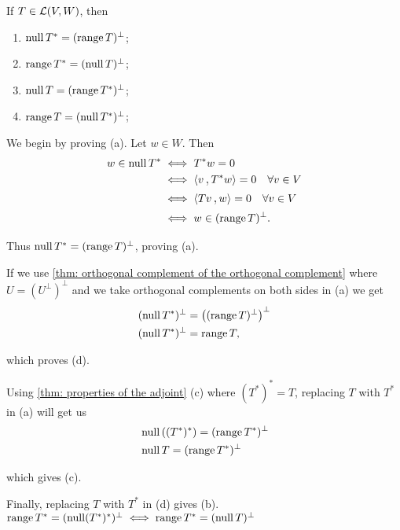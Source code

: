 \begin{thm}
  \label{thm: null space and range of T^*}
  If $T \in {\mathcal{L}(V,W)}$, then
  \begin{enumerate}[label=\textbf{(\alph*)}]
    \item $\operatorname{null} T^* = (\operatorname{range} T)^\bot$;
    \item $\operatorname{range} T^* = (\operatorname{null} T)^\bot$;
    \item $\operatorname{null} T = (\operatorname{range} T^*)^\bot$;
    \item $\operatorname{range} T = (\operatorname{null} T^*)^\bot$;
  \end{enumerate}
\end{thm}
\begin{prf}
  We begin by proving (a). Let $w \in W$. Then
  \[
  \begin{aligned}
    w \in \mynull T^*
    &\iff T^*w = 0 \\
    &\iff \ip{v}{T^*w} = 0 \quad \forall v \in V\\
    &\iff \ip{Tv}{w} = 0 \quad \forall v \in V\\
    &\iff w \in (\myrange T)^\bot.
  \end{aligned}
  \]

  Thus $\operatorname{null} T^* = (\operatorname{range} T)^\bot$, proving (a).

  If we use \ref{thm: orthogonal complement of the orthogonal complement} where $U=(U^\bot)^\bot$ and we take orthogonal complements on both sides in (a) we get
  \[
  \begin{aligned}
    &(\operatorname{null} T^*)^\bot = \left((\operatorname{range} T)^\bot\right)^\bot \\
    &(\operatorname{null} T^*)^\bot = \operatorname{range} T,
  \end{aligned}
  \]

  which proves (d).

  Using \ref{thm: properties of the adjoint} (c) where $(T^*)^* = T$, replacing $T$ with $T^*$ in (a) will get us
  \[
  \begin{aligned}
      &\operatorname{null} \left((T^*)^*\right)=(\operatorname{range} T^*)^\bot \\
    &\operatorname{null} T = (\operatorname{range} T^*)^\bot \\
  \end{aligned}
  \]

  which gives (c).

  Finally, replacing $T$ with $T^*$ in (d) gives (b).
  $
    \operatorname{range} T^* = (\operatorname{null} (T^*)^*)^\bot \iff \operatorname{range} T^* = (\operatorname{null} T)^\bot
  $
\end{prf}

